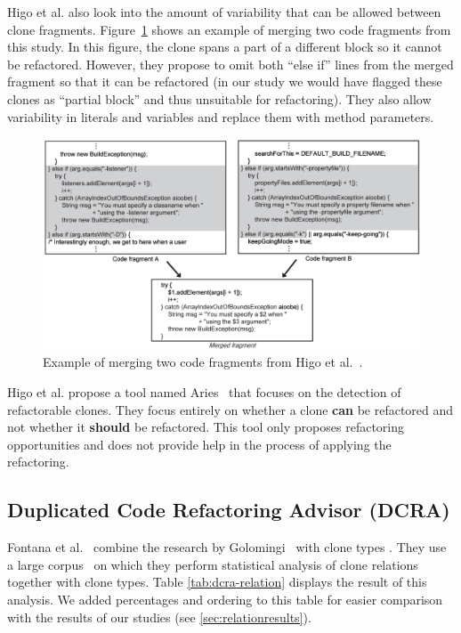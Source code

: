 Higo et al. also look into the amount of variability that can be allowed between clone fragments. Figure~\ref{fig:higomerge} shows an example of merging two code fragments from this study. In this figure, the clone spans a part of a different block so it cannot be refactored. However, they propose to omit both ``else if'' lines from the merged fragment so that it can be refactored (in our study we would have flagged these clones as ``partial block'' and thus unsuitable for refactoring). They also allow variability in literals and variables and replace them with method parameters.

\begin{figure}[H]
  \includegraphics[width=1\textwidth]{img/higo}
  \caption{Example of merging two code fragments from Higo et al.~\cite{higo2008metric}.}
  \label{fig:higomerge}
\end{figure}

Higo et al. propose a tool named Aries~\cite{higo2004aries, higo2008metric} that focuses on the detection of refactorable clones. They focus entirely on whether a clone \textbf{can} be refactored and not whether it \textbf{should} be refactored. This tool only proposes refactoring opportunities and does not provide help in the process of applying the refactoring. %

\subsection{Duplicated Code Refactoring Advisor (DCRA)}
Fontana et al.~\cite{fontana2012duplicated, fontana2015duplicated} combine the research by Golomingi~\cite{koni2001scenario} with clone types \cite{roy2007survey}. They use a large corpus~\cite{tempero2010qualitas} on which they perform statistical analysis of clone relations together with clone types. Table \ref{tab:dcra-relation} displays the result of this analysis. We added percentages and ordering to this table for easier comparison with the results of our studies (see \ref{sec:relationresults}).

